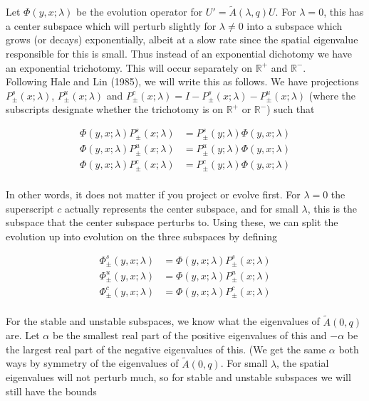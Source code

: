 \documentclass[12pt]{article}
\def\R{{\mathbb R}}
\begin{document}
Let $\Phi(y,x; \lambda)$ be the evolution operator for $U' = \tilde{A}(\lambda, q) U$. For $\lambda = 0$, this has a center subspace which will perturb slightly for $\lambda \neq 0$ into a subspace which grows (or decays) exponentially, albeit at a slow rate since the spatial eigenvalue responsible for this is small. Thus instead of an exponential dichotomy we have an exponential trichotomy. This will occur separately on $\R^+$ and $\R^-$.\\

Following Hale and Lin (1985), we will write this as follows. We have projections $P^s_\pm(x; \lambda)$, $P^u_\pm(x; \lambda)$ and $P^c_\pm(x; \lambda) = I - P^s_\pm(x; \lambda) - P^u_\pm(x; \lambda)$ (where the subscripts designate whether the trichotomy is on $\R^+$ or $\R^-$) such that

\begin{align*}
\Phi(y, x; \lambda)P^s_\pm(x; \lambda) &= P^s_\pm(y; \lambda)\Phi(y, x; \lambda) \\
\Phi(y, x; \lambda)P^u_\pm(x; \lambda) &= P^u_\pm(y; \lambda)\Phi(y, x; \lambda) \\
\Phi(y, x; \lambda)P^c_\pm(x; \lambda) &= P^c_\pm(y; \lambda)\Phi(y, x; \lambda) \\
\end{align*}

In other words, it does not matter if you project or evolve first. For $\lambda = 0$ the superscript $c$ actually represents the center subspace, and for small $\lambda$, this is the subspace that the center subspace perturbs to. Using these, we can split the evolution up into evolution on the three subspaces by defining

\begin{align*}
\Phi^s_\pm(y, x; \lambda) &= \Phi(y, x; \lambda)P^s_\pm(x; \lambda) \\
\Phi^u_\pm(y, x; \lambda) &= \Phi(y, x; \lambda)P^u_\pm(x; \lambda) \\
\Phi^c_\pm(y, x; \lambda) &= \Phi(y, x; \lambda)P^c_\pm(x; \lambda) \\
\end{align*}

For the stable and unstable subspaces, we know what the eigenvalues of $\tilde{A}(0, q)$ are. Let $\alpha$ be the smallest real part of the positive eigenvalues of this and $-\alpha$ be the largest real part of the negative eigenvalues of this. (We get the same $\alpha$ both ways by symmetry of the eigenvalues of $\tilde{A}(0, q)$. For small $\lambda$, the spatial eigenvalues will not perturb much, so for stable and unstable subspaces we will still have the bounds
\end{document}
